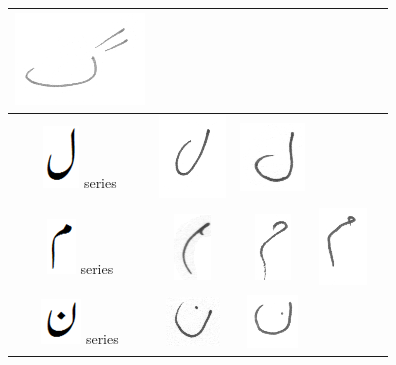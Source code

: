 \documentclass[a4paper,conference]{IEEEtran}
\begin{document}
\begin{table}[h]
\begin{tabular}{@{}ccccc@{}}
\includegraphics[scale=0.10]{66}  & \\
\hline
\includegraphics[scale=0.15]{Laam_orig} series & \includegraphics[scale=0.15]{67} & \includegraphics[scale=0.15]{68}  & &  \\
\hline
\includegraphics[scale=0.15]{meem_orig} series & \includegraphics[scale=0.15]{69} & \includegraphics[scale=0.15]{70}  &
\includegraphics[scale=0.15]{71}  & \\
\hline
\includegraphics[scale=0.15]{noon_orig} series & \includegraphics[scale=0.15]{72} & \includegraphics[scale=0.15]{73} & & \\

\end{tabular}
\end{table}
\end{document}
